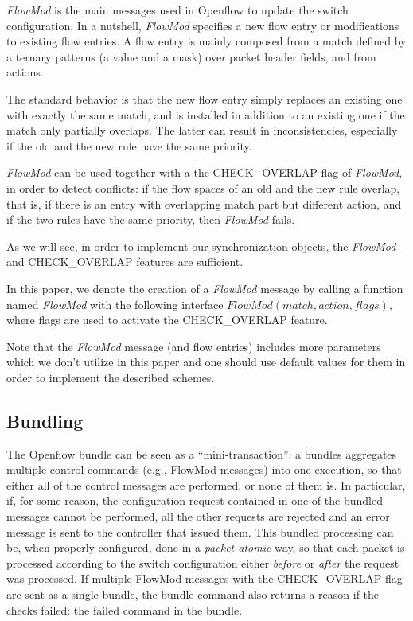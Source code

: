 \documentclass[conference]{sigcomm-alternate}
\newcommand{\liron}[1]{\textit{\textcolor{mygreen}{[liron]: #1}}} %
\begin{document}
\emph{FlowMod} is the main messages used in Openflow 
to update the switch configuration. 
In a nutshell, \emph{FlowMod} specifies a new flow entry or modifications to existing flow entries.
A flow entry is mainly composed from a match defined by a ternary patterns (a value and a mask) over packet header fields, and from actions.

The standard behavior is that the new flow entry simply replaces an existing one
with exactly the same match, and is installed
in addition to an existing one if the match only
partially overlaps. The latter can result
in inconsistencies, especially if the old and the new rule
have the same priority. 


\emph{FlowMod} can be used together with a the CHECK\_OVERLAP flag
of \emph{FlowMod}, in order to detect conflicts: if the flow spaces of an old
and the new rule overlap, 
that is, if there is an entry with overlapping match part but different action, 
 and if the two rules have the same priority, then 
\emph{FlowMod} fails. 

As we will see, in order to implement our synchronization objects,
the \emph{FlowMod} and CHECK\_OVERLAP features are sufficient.

In this paper, we denote the creation of a \emph{FlowMod} message by calling a function named \emph{FlowMod} with the following interface $FlowMod(match, action, flags)$, where flags are used to activate the CHECK\_OVERLAP feature.

Note that the \emph{FlowMod} message (and flow entries) includes more parameters which we don't utilize in this paper and one should use default values for them in order to implement the described schemes.

\subsection{Bundling}

The Openflow bundle can be seen as a ``mini-transaction'':
a bundles aggregates multiple control commands (e.g., FlowMod messages)
into one execution, so that either all of the control messages are
performed, or none of them is. In particular, if, for some reason, the
configuration request contained in one of the bundled messages cannot
be performed, all the other requests  are rejected and an error
message is sent to the controller that issued them.
This bundled processing can be, when properly configured, done in a
\emph{packet-atomic} way, so that each packet is processed according
to the switch configuration either \emph{before} or \emph{after} the
request was processed.
If multiple FlowMod messages with the CHECK\_OVERLAP flag are sent as a single bundle, the bundle command also returns a reason 
if the checks failed: the failed command in the bundle.
\end{document}
